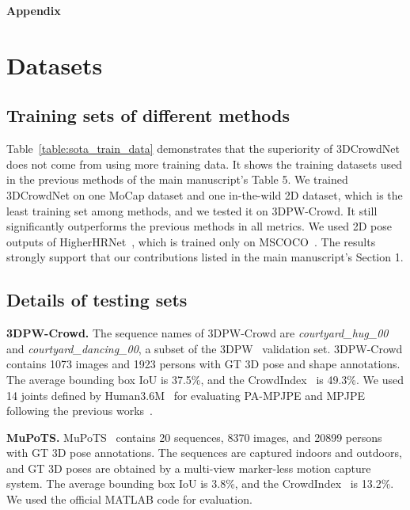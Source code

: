 \documentclass[10pt,twocolumn,letterpaper]{article}
\begin{document}
\noindent\textbf{\Large{Appendix}}
\section{Datasets}





\subsection{Training sets of different methods}
\label{supp:train_set}

Table~\ref{table:sota_train_data} demonstrates that the superiority of 3DCrowdNet does not come from using more training data.
It shows the training datasets used in the previous methods of the main manuscript's Table 5.
We trained 3DCrowdNet on one MoCap dataset and one in-the-wild 2D dataset, which is the least training set among methods, and we tested it on 3DPW-Crowd.
It still significantly outperforms the previous methods in all metrics.
We used 2D pose outputs of HigherHRNet~\cite{cheng2020higherhrnet}, which is trained only on MSCOCO~\cite{lin2014mscoco}.
The results strongly support that our contributions listed in the main manuscript's Section 1.

\subsection{Details of testing sets}
\label{supp:test_set}
\noindent\textbf{3DPW-Crowd.}
The sequence names of 3DPW-Crowd are \textit{courtyard\_hug\_00} and \textit{courtyard\_dancing\_00}, a subset of the 3DPW~\cite{von20183dpw} validation set.
3DPW-Crowd contains 1073 images and 1923 persons with GT 3D pose and shape annotations.
The average bounding box IoU is 37.5\%, and the CrowdIndex~\cite{li2019crowdpose} is 49.3\%.
We used 14 joints defined by Human3.6M~\cite{ionescu2014human3} for evaluating PA-MPJPE and MPJPE following the previous works~\cite{kolotouros2019learning,choi2020p2m,moon2020i2l}.



\noindent\textbf{MuPoTS.}
MuPoTS~\cite{mehta2018single} contains 20 sequences, 8370 images, and 20899 persons with GT 3D pose annotations.
The sequences are captured indoors and outdoors, and GT 3D poses are obtained by a multi-view marker-less motion capture system.
The average bounding box IoU is 3.8\%, and the CrowdIndex~\cite{li2019crowdpose} is 13.2\%.
We used the official MATLAB code for evaluation.
\end{document}

